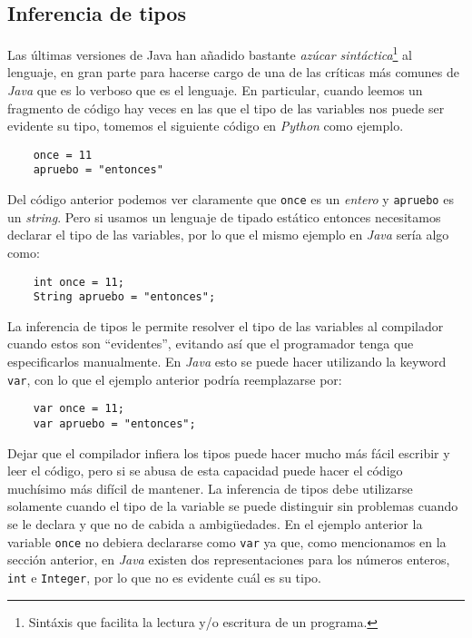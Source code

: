 \subsection{Inferencia de tipos}
  Las últimas versiones de Java han añadido bastante \textit{azúcar sintáctica}\footnote{Sintáxis
  que facilita la lectura y/o escritura de un programa.} al lenguaje, en gran parte para hacerse
  cargo de una de las críticas más comunes de \textit{Java} que es lo verboso que es el lenguaje.
  En particular, cuando leemos un fragmento de código hay veces en las que el tipo de las variables
  nos puede ser evidente su tipo, tomemos el siguiente código en \textit{Python} como ejemplo.

  \begin{verbatim}
    once = 11
    apruebo = "entonces"
  \end{verbatim}

  Del código anterior podemos ver claramente que \texttt{once} es un \emph{entero} y 
  \texttt{apruebo} es un \emph{string}.
  Pero si usamos un lenguaje de tipado estático entonces necesitamos declarar el tipo de las 
  variables, por lo que el mismo ejemplo en \textit{Java} sería algo como:

  \begin{verbatim}
    int once = 11;
    String apruebo = "entonces";
  \end{verbatim}

  La inferencia de tipos le permite resolver el tipo de las variables al compilador cuando estos son
  \enquote{evidentes}, evitando así que el programador tenga que especificarlos manualmente.
  En \textit{Java} esto se puede hacer utilizando la keyword \texttt{var}, con lo que el
  ejemplo anterior podría reemplazarse por:

  \begin{verbatim}
    var once = 11;
    var apruebo = "entonces";
  \end{verbatim}

  Dejar que el compilador infiera los tipos puede hacer mucho más fácil escribir y leer el código,
  pero si se abusa de esta capacidad puede hacer el código muchísimo más difícil de mantener.
  La inferencia de tipos debe utilizarse solamente cuando el tipo de la variable se puede distinguir
  sin problemas cuando se le declara y que no de cabida a ambigüedades.
  En el ejemplo anterior la variable \texttt{once} no debiera declararse como \texttt{var} ya que,
  como mencionamos en la sección anterior, en \textit{Java} existen dos representaciones para los
  números enteros, \texttt{int} e \texttt{Integer}, por lo que no es evidente cuál es su 
  tipo.
  
